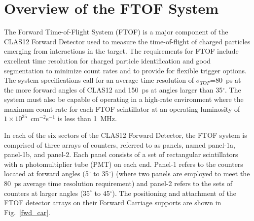 \documentclass{elsart}
\begin{document}

\section{Overview of the FTOF System}
\label{sec:overview}

The Forward Time-of-Flight System (FTOF) is a major component of the CLAS12 Forward Detector
used to measure the time-of-flight of charged particles emerging from interactions in the target.
The requirements for FTOF include excellent time resolution for charged particle identification and
good segmentation to minimize count rates and to provide for flexible trigger options. The system
specifications call for an average time resolution of $\sigma_{TOF}$=80~ps at the more forward angles
of CLAS12 and 150~ps at angles larger than 35$^\circ$. The system must also be capable of operating
in a high-rate environment where the maximum count rate for each FTOF scintillator at an operating
luminosity of $1 \times 10^{35}$~cm$^{-2}$s$^{-1}$ is less than 1~MHz.

In each of the six sectors of the CLAS12 Forward Detector, the FTOF system is comprised of three
arrays of counters, referred to as panels, named panel-1a, panel-1b, and panel-2. Each panel consists
of a set of rectangular scintillators with a photomultiplier tube (PMT) on each end. Panel-1 refers to
the counters located at forward angles (5$^\circ$ to 35$^\circ$) (where two panels are employed to
meet the 80~ps average time resolution requirement) and panel-2 refers to the sets of counters at
larger angles ($35^\circ$ to 45$^\circ$). The positioning and attachment of the FTOF detector arrays
on their Forward Carriage supports are shown in Fig.~\ref{fwd_car}.
\end{document}
